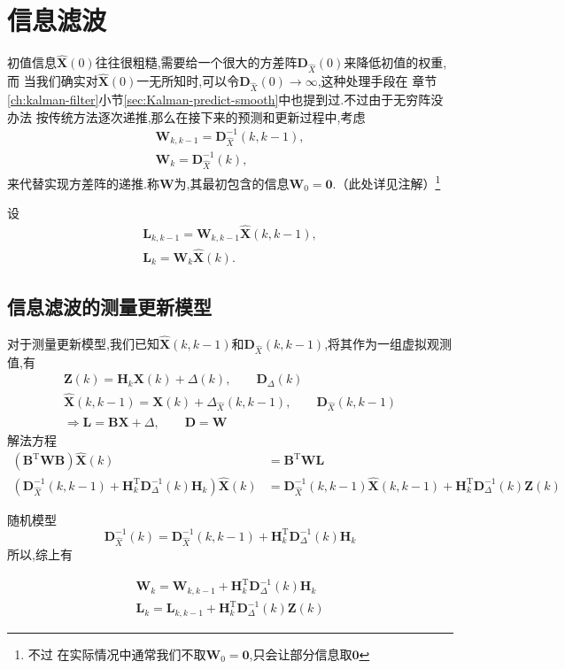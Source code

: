 \documentclass[cn,10pt,citestyle=gb7714-2015,bibstyle=gb7714-2015]{elegantbook}
\newcommand{\mT}{\mathrm{T}}
\begin{document}
\section{信息滤波}
初值信息$\hat{\bm{X}}(0)$往往很粗糙,需要给一个很大的方差阵$\bm{D}_{\hat{X}}(0)$来降低初值的权重,而
当我们确实对$\hat{\bm{X}}(0)$一无所知时,可以令$\bm{D}_{\hat{X}}(0)\to \infty$,这种处理手段在
章节\ref{ch:kalman-filter}小节\ref{sec:Kalman-predict-smooth}中也提到过.不过由于无穷阵没办法
按传统方法逐次递推,那么在接下来的预测和更新过程中,考虑
\begin{gather}
  \bm{W}_{k,k-1}=\bm{D}_{\hat{X}}^{-1}(k,k-1),\\
  \bm{W}_k=\bm{D}_{\hat{X}}^{-1}(k),
\end{gather}
来代替实现方差阵的递推.称$\bm{W}$为,其最初包含的信息$\bm{W}_0=\bm{0}$.（此处详见注解）\footnote{不过
在实际情况中通常我们不取$\bm{W}_0=\bm{0}$,只会让部分信息取$\bm{0}$}

设
\begin{gather}
  \bm{L}_{k,k-1}=\bm{W}_{k,k-1}\hat{\bm{X}}(k,k-1),\\
  \bm{L}_k=\bm{W}_k\hat{\bm{X}}(k).
\end{gather}
\subsection{信息滤波的测量更新模型}
对于测量更新模型,我们已知$\hat{\bm{X}}(k,k-1)$和$\bm{D}_{\hat{X}}(k,k-1)$,将其作为一组虚拟观测值,有
\begin{gather*}
  \bm{Z}(k)=\bm{H}_k\bm{X}(k)+\bm{\varDelta}(k),\qquad\bm{D}_\varDelta(k)\\
  \hat{\bm{X}}(k,k-1)=\bm{X}(k)+\bm{\varDelta}_{\hat{X}}(k,k-1),\qquad\bm{D}_{\hat{X}}(k,k-1)\\
  \Longrightarrow\boxed{\bm{L}=\bm{B}\bm{X}+\bm{\varDelta},\qquad\bm{D}=\bm{W}}
\end{gather*}
解法方程
\begin{align*}
  (\bm{B}^\mT\bm{W}\bm{B})\hat{\bm{X}}(k)&=\bm{B}^\mT\bm{W}\bm{L}\\
  \left(\bm{D}_{\hat{X}}^{-1}(k,k-1)+\bm{H}_k^\mT\bm{D}_\varDelta^{-1}(k)\bm{H}_k\right)\hat{\bm{X}}(k)&=\bm{D}_{\hat{X}}^{-1}(k,k-1)\hat{\bm{X}}(k,k-1)+\bm{H}_k^\mT\bm{D}_\varDelta^{-1}(k)\bm{Z}(k)
\end{align*}

随机模型
\begin{equation}
  \bm{D}_{\hat{X}}^{-1}(k)=\bm{D}_{\hat{X}}^{-1}(k,k-1)+\bm{H}_k^\mT\bm{D}_\varDelta^{-1}(k)\bm{H}_k
\end{equation}
所以,综上有
\begin{theorem}[信息滤波的测量更新模型]\label{thm:information-kalman-measurement-update}
  \begin{gather}
    \bm{W}_k=\bm{W}_{k,k-1}+\bm{H}_k^\mT\bm{D}_\varDelta^{-1}(k)\bm{H}_k\\
    \bm{L}_k=\bm{L}_{k,k-1}+\bm{H}_k^\mT\bm{D}_\varDelta^{-1}(k)\bm{Z}(k)
  \end{gather}
\end{theorem}
\end{document}
